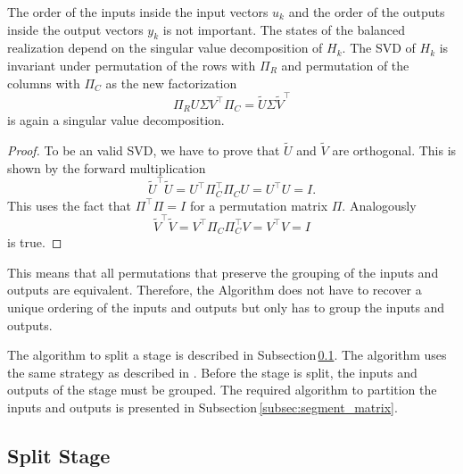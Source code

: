 \documentclass[doctype=mastersthesis,BCOR=15mm,biblatex]{ldvbook}%
\newcommand{\eye}{I} %
\begin{document}
The order of the inputs inside the input vectors $u_k$ and the order of the outputs inside the output vectors $y_k$ is not important.
The states of the balanced realization depend on the singular value decomposition of $H_k$.
The SVD of $H_k$ is invariant under permutation of the rows with $\Pi_R$ and permutation of the columns with $\Pi_C$ as the new factorization
\begin{equation}
\Pi_R U \Sigma V^\top \Pi_C = \tilde{U} \Sigma \tilde{V}^\top 
\end{equation}
is again a singular value decomposition.
\begin{proof}
	To be an valid SVD, we have to prove that $\tilde{U}$ and $\tilde{V}$ are orthogonal.
	This is shown by the forward multiplication
	\begin{equation}
	\tilde{U}^\top \tilde{U} = U^\top \Pi_C^\top \Pi_C U = U^\top U = \eye 
	.
	\end{equation}
	This uses the fact that $\Pi^\top \Pi = \eye$ for a permutation matrix $\Pi$.
	Analogously 
	\begin{equation}
	\tilde{V}^\top \tilde{V} = V^\top \Pi_C \Pi_C^\top V = V^\top V = \eye
	\end{equation}
	is true.
\end{proof}
This means that all permutations that preserve the grouping of the inputs and outputs are equivalent.
Therefore, the Algorithm does not have to recover a unique ordering of the inputs and outputs but only has to group the inputs and outputs.

The algorithm to split a stage is described in Subsection\,\ref{subsec:split_stage}.
The algorithm uses the same strategy as described in \cite{chandrasekaran_fast_2005}.
Before the stage is split, the inputs and outputs of the stage must be grouped. 
The required algorithm to partition the inputs and outputs is presented in Subsection\,\ref{subsec:segment_matrix}.


\subsection{Split Stage}\label{subsec:split_stage}
\end{document}
